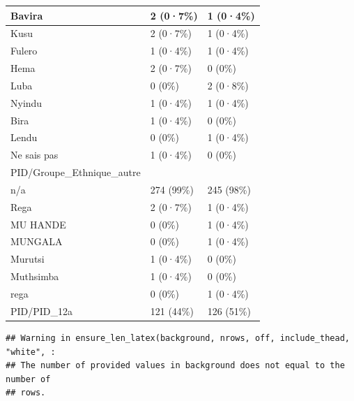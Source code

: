 \documentclass[
]{book}
\begin{document}
\begin{tabular}{l|l|l}
\hline
Bavira & 2 (0·7\%) & 1 (0·4\%)\\
\hline
Kusu & 2 (0·7\%) & 1 (0·4\%)\\
\hline
Fulero & 1 (0·4\%) & 1 (0·4\%)\\
\hline
Hema & 2 (0·7\%) & 0 (0\%)\\
\hline
Luba & 0 (0\%) & 2 (0·8\%)\\
\hline
Nyindu & 1 (0·4\%) & 1 (0·4\%)\\
\hline
Bira & 1 (0·4\%) & 0 (0\%)\\
\hline
Lendu & 0 (0\%) & 1 (0·4\%)\\
\hline
Ne sais pas & 1 (0·4\%) & 0 (0\%)\\
\hline
PID/Groupe\_Ethnique\_autre &  & \\
\hline
n/a & 274 (99\%) & 245 (98\%)\\
\hline
Rega & 2 (0·7\%) & 1 (0·4\%)\\
\hline
MU HANDE & 0 (0\%) & 1 (0·4\%)\\
\hline
MUNGALA & 0 (0\%) & 1 (0·4\%)\\
\hline
Murutsi & 1 (0·4\%) & 0 (0\%)\\
\hline
Muthsimba & 1 (0·4\%) & 0 (0\%)\\
\hline
rega & 0 (0\%) & 1 (0·4\%)\\
\hline
PID/PID\_12a & 121 (44\%) & 126 (51\%)\\
\hline
\end{tabular}

\begin{verbatim}
## Warning in ensure_len_latex(background, nrows, off, include_thead, "white", :
## The number of provided values in background does not equal to the number of
## rows.
\end{verbatim}
\end{document}

